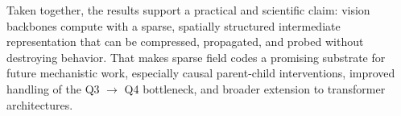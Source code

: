 \documentclass[10pt,twocolumn]{article}
\begin{document}
Taken together, the results support a practical and scientific claim: vision backbones compute with a sparse, spatially structured intermediate representation that can be compressed, propagated, and probed without destroying behavior. That makes sparse field codes a promising substrate for future mechanistic work, especially causal parent-child interventions, improved handling of the Q3 $\rightarrow$ Q4 bottleneck, and broader extension to transformer architectures.
\end{document}
